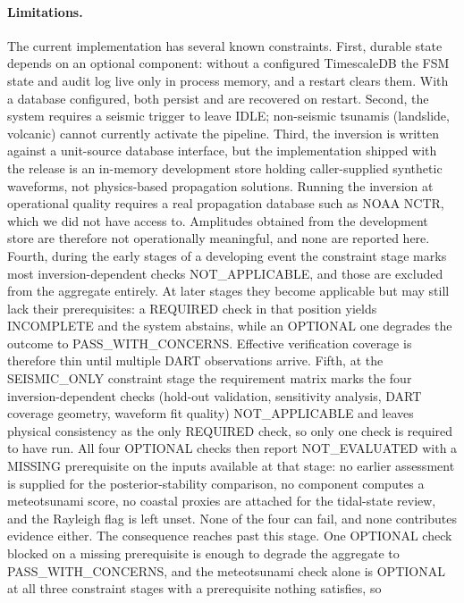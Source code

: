 \documentclass{article}
\begin{document}
\paragraph{Limitations.}
The current implementation has several known constraints. First,
durable state depends on an optional component: without a configured
TimescaleDB the FSM state and audit log live only in process memory,
and a restart clears them. With a database configured, both persist
and are recovered on restart. Second, the system
requires a seismic trigger to leave IDLE; non-seismic tsunamis
(landslide, volcanic) cannot currently activate the pipeline.
Third, the inversion is written against a unit-source database
interface, but the implementation shipped with the release is an
in-memory development store holding caller-supplied synthetic
waveforms, not physics-based propagation solutions.  Running the
inversion at operational quality requires a real propagation database
such as NOAA NCTR, which we did not have access to.  Amplitudes
obtained from the development store are therefore not operationally
meaningful, and none are reported here.
Fourth, during the early stages of a developing event the constraint
stage marks most inversion-dependent checks NOT\_APPLICABLE, and those
are excluded from the aggregate entirely.  At later stages they become
applicable but may still lack their prerequisites: a REQUIRED check in
that position yields INCOMPLETE and the system abstains, while an
OPTIONAL one degrades the outcome to PASS\_WITH\_CONCERNS.  Effective
verification coverage is therefore thin until multiple DART
observations arrive.
Fifth, at the SEISMIC\_ONLY constraint stage the requirement matrix
marks the four inversion-dependent checks (hold-out validation,
sensitivity analysis, DART coverage geometry, waveform fit quality)
NOT\_APPLICABLE and leaves physical consistency as the only REQUIRED
check, so only one check is required to have run.  All four OPTIONAL
checks then report NOT\_EVALUATED with a MISSING prerequisite on the
inputs available at that stage: no earlier assessment is supplied for
the posterior-stability comparison, no component computes a
meteotsunami score, no coastal proxies are attached for the tidal-state
review, and the Rayleigh flag is left unset.  None of the four can
fail, and none contributes evidence either.
The consequence reaches past this stage.  One OPTIONAL check blocked on
a missing prerequisite is enough to degrade the aggregate to
PASS\_WITH\_CONCERNS, and the meteotsunami check alone is OPTIONAL at
all three constraint stages with a prerequisite nothing satisfies, so
\end{document}
